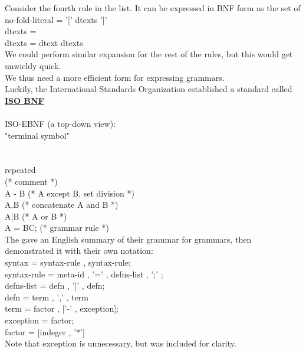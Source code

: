 \documentclass[../../lecture_notes.tex]{subfiles}
\begin{document}
Consider the fourth rule in the list.  It can be expressed in BNF form as the set of\\
	\indent no-fold-literal = '[' dtexts ']'\\
	\indent dtexts =\\
	\indent dtexts = dtext dtexts\\
We could perform similar expansion for the rest of the rules, but this would get unwieldy quick.\\
We thus need a more efficient form for expressing grammars.\\
Luckily, the International Standards Organization established a standard called \textbf{\underline{ISO BNF}}\\
\\
ISO-EBNF (a top-down view):\\
\indent "terminal symbol"\\
\indent [optional]\\
\\
\indent *repeated\\
\indent (* comment *)\\
\indent A - B (* A except B, set division *)\\
\indent A,B (* concatenate A and B *)\\
\indent A|B (* A or B *)\\
\indent A = BC; (* grammar rule *)\\
The gave an English summary of their grammar for grammars, then demonstrated it with their own notation:\\
\indent syntax = syntax-rule , {syntax-rule};\\
\indent syntax-rule = meta-id , '=' , defns-list , ';' ;\\
\indent defns-list = defn , {'|' , defn};\\
\indent defn = term , {',' , term}\\
\indent term = factor , ['-' , exception];\\
\indent exception = factor;\\
\indent factor = [indeger , '*']\\
Note that exception is unnecessary, but was included for clarity.\\
\newpage
\end{document}
